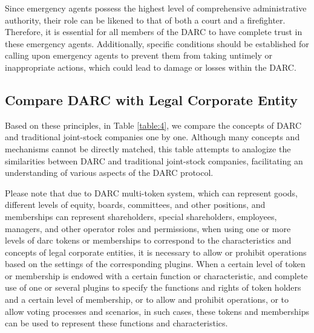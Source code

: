 \documentclass[main.tex]{subfiles}
\begin{document}
Since emergency agents possess the highest level of comprehensive administrative authority, their role can be likened to that of both a court and a firefighter. Therefore, it is essential for all members of the DARC to have complete trust in these emergency agents. Additionally, specific conditions should be established for calling upon emergency agents to prevent them from taking untimely or inappropriate actions, which could lead to damage or losses within the DARC.

\subsection{Compare DARC with Legal Corporate Entity}

Based on these principles, in Table \ref{table:4}, we compare the concepts of DARC and traditional joint-stock companies one by one. Although many concepts and mechanisms cannot be directly matched, this table attempts to analogize the similarities between DARC and traditional joint-stock companies, facilitating an understanding of various aspects of the DARC protocol.

Please note that due to DARC multi-token system, which can represent goods, different levels of equity, boards, committees, and other positions, and memberships can represent shareholders, special shareholders, employees, managers, and other operator roles and permissions, when using one or more levels of darc tokens or memberships to correspond to the characteristics and concepts of legal corporate entities, it is necessary to allow or prohibit operations based on the settings of the corresponding plugins. When a certain level of token or membership is endowed with a certain function or characteristic, and complete use of one or several plugins to specify the functions and rights of token holders and a certain level of membership, or to allow and prohibit operations, or to allow voting processes and scenarios, in such cases, these tokens and memberships can be used to represent these functions and characteristics.
\end{document}
